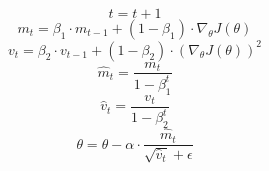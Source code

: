 \begin{equation}
    t = t + 1 
    \label{eq:1}
\end{equation}
\begin{equation}
    m_t = \beta_1 \cdot m_{t-1} + (1 - \beta_1) \cdot \nabla_{\theta} J(\theta) 
    \label{eq:2}
\end{equation}
\begin{equation}
    v_t = \beta_2 \cdot v_{t-1} + (1 - \beta_2) \cdot (\nabla_{\theta} J(\theta))^2 \label{eq:3}
\end{equation}
\begin{equation}
    \hat{m}_t = \frac{m_t}{1 - \beta_1^t}
    \label{eq:4}
\end{equation}
\begin{equation}
    \hat{v}_t = \frac{v_t}{1 - \beta_2^t}
    \label{eq:5}
\end{equation}
\begin{equation}
    \theta = \theta - \alpha \cdot \frac{\hat{m}_t}{\sqrt{\hat{v}_t} + \epsilon}
    \label{eq:6}
\end{equation}